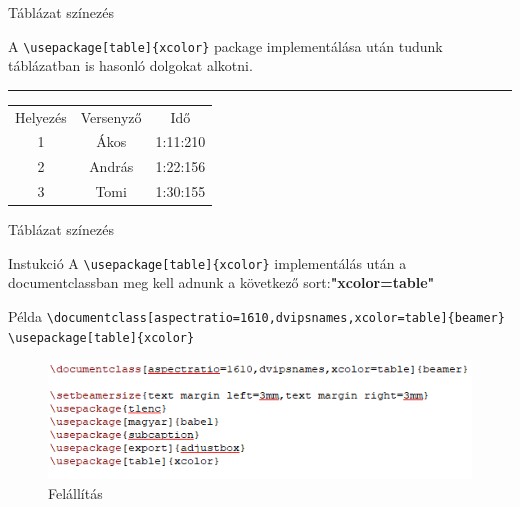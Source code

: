 \documentclass[aspectratio=1610,dvipsnames,xcolor=table]{beamer}
\begin{document}
\begin{frame}[fragile]{Táblázat színezés}
\begin{center}

A \verb!\usepackage[table]{xcolor}! package implementálása után tudunk táblázatban is hasonló dolgokat alkotni.
\noindent
{\color{Dandelion} \rule{\linewidth}{1mm}}
\end{center}

\vfill
\begin{center}
  \begin{tabular}{|c|c|c|}
     \hline
    \rowcolor{Apricot}Helyezés & Versenyző & Idő \\
    \cellcolor{ForestGreen}1 & \cellcolor{Orchid}Ákos & \cellcolor{Aquamarine}1:11:210 \\
    \cellcolor{Yellow}2  & \cellcolor{Mulberry}András & \cellcolor{Emerald}1:22:156  \\
    \cellcolor{BurntOrange}3 & \cellcolor{Plum}Tomi  &  \cellcolor{PineGreen}1:30:155 \\
    \hline
    \end{tabular}
\end{center}
\end{frame}

\begin{frame}[fragile]{Táblázat színezés}
	\onslide<1->\begin{block}{Instukció}
 		A \verb!\usepackage[table]{xcolor}! implementálás után a documentclassban meg 				kell adnunk a következő sort:\textbf{"xcolor=table"}
	\end{block} 
	\begin{exampleblock}{Példa}
    {
       \verb!\documentclass[aspectratio=1610,dvipsnames,xcolor=table]{beamer}!
       \verb!\usepackage[table]{xcolor}!
    }
    \end{exampleblock}	
    \begin{figure}[H]
			 \includegraphics[scale=0.8]{img/tablesetup.png}
			 \onslide<2->\caption{Felállítás}
	\end{figure}
\end{frame}
\end{document}
